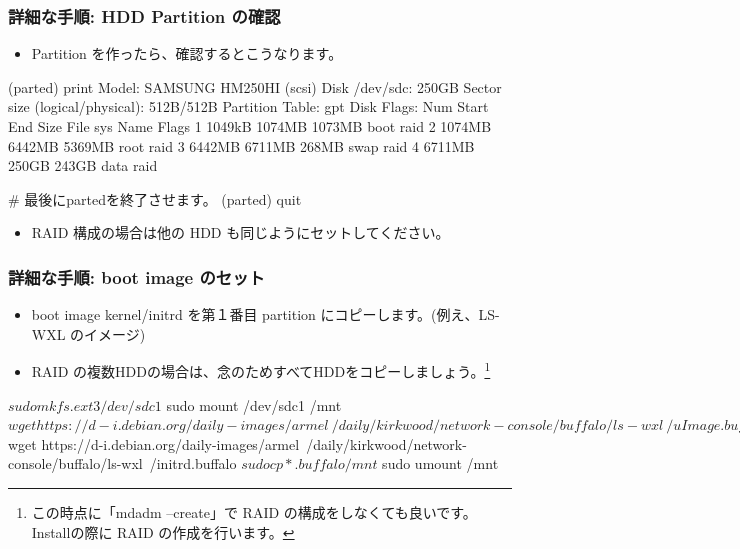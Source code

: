 \documentclass[mingoth,a4paper]{jsarticle}
\begin{document}
\subsubsection{詳細な手順: HDD Partition の確認}
\begin{itemize}
\item Partition を作ったら、確認するとこうなります。
\end{itemize}
\begin{commandline}
(parted) print
Model: SAMSUNG HM250HI (scsi)
Disk /dev/sdc: 250GB
Sector size (logical/physical): 512B/512B
Partition Table: gpt
Disk Flags:
Num Start   End     Size    File sys  Name  Flags
 1  1049kB  1074MB  1073MB            boot  raid
 2  1074MB  6442MB  5369MB            root  raid
 3  6442MB  6711MB  268MB             swap  raid
 4  6711MB  250GB   243GB             data  raid

# 最後にpartedを終了させます。
(parted) quit
\end{commandline}
\begin{itemize}
\item RAID 構成の場合は他の HDD も同じようにセットしてください。
\end{itemize}

\subsubsection{詳細な手順: boot image のセット}
\begin{itemize}
\item boot image kernel/initrd を第１番目 partition にコピーします。(例え、LS-WXL のイメージ)
\item RAID の複数HDDの場合は、念のためすべてHDDをコピーしましょう。\footnote{この時点に「mdadm --create」で RAID の構成をしなくても良いです。Installの際に RAID の作成を行います。}
\end{itemize}
\begin{commandline}
$ sudo mkfs.ext3 /dev/sdc1
$ sudo mount /dev/sdc1 /mnt
$ wget https://d-i.debian.org/daily-images/armel\
  /daily/kirkwood/network-console/buffalo/ls-wxl\
  /uImage.buffalo
$ wget https://d-i.debian.org/daily-images/armel\
  /daily/kirkwood/network-console/buffalo/ls-wxl\
  /initrd.buffalo
$ sudo cp *.buffalo /mnt
$ sudo umount /mnt
\end{commandline}
\end{document}
